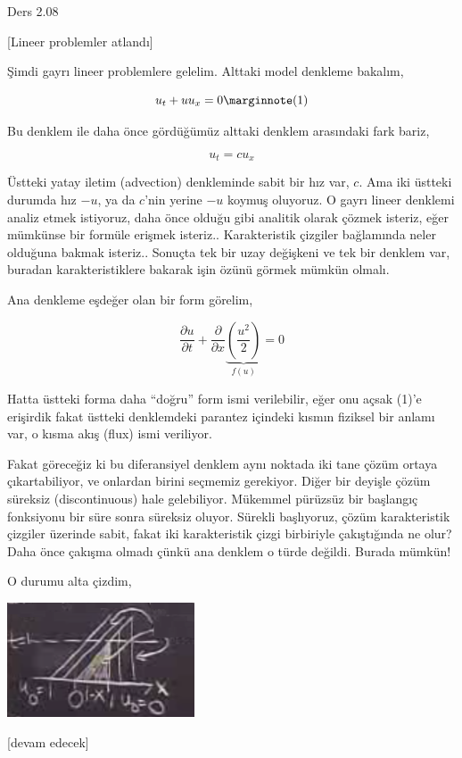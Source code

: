 \documentclass[12pt,fleqn]{article}\usepackage{../../common}
\begin{document}
Ders 2.08

[Lineer problemler atlandı]

Şimdi gayrı lineer problemlere gelelim. Alttaki model denkleme bakalım,

$$
u_t + u u_x = 0
\mlabel{1}
$$

Bu denklem ile daha önce gördüğümüz alttaki denklem arasındaki fark bariz,

$$
u_t = c u_x
$$

Üstteki yatay iletim (advection) denkleminde sabit bir hız var, $c$. Ama iki
üstteki durumda hız $-u$, ya da $c$'nin yerine $-u$ koymuş oluyoruz.  O gayrı
lineer denklemi analiz etmek istiyoruz, daha önce olduğu gibi analitik olarak
çözmek isteriz, eğer mümkünse bir formüle erişmek isteriz.. Karakteristik
çizgiler bağlamında neler olduğuna bakmak isteriz.. Sonuçta tek bir uzay
değişkeni ve tek bir denklem var, buradan karakteristiklere bakarak işin
özünü görmek mümkün olmalı.

Ana denkleme eşdeğer olan bir form görelim,

$$
\frac{\partial u}{\partial t} +
\frac{\partial }{\partial x}
\underbrace{ \left( \frac{u^2}{2} \right)}_{f(u)} = 0
$$

Hatta üstteki forma daha ``doğru'' form ismi verilebilir, eğer onu açsak (1)'e
erişirdik fakat üstteki denklemdeki parantez içindeki kısmın fiziksel bir anlamı
var, o kısma akış (flux) ismi veriliyor.

Fakat göreceğiz ki bu diferansiyel denklem aynı noktada iki tane çözüm ortaya
çıkartabiliyor, ve onlardan birini seçmemiz gerekiyor. Diğer bir deyişle çözüm
süreksiz (discontinuous) hale gelebiliyor. Mükemmel pürüzsüz bir başlangıç
fonksiyonu bir süre sonra süreksiz oluyor. Sürekli başlıyoruz, çözüm
karakteristik çizgiler üzerinde sabit, fakat iki karakteristik çizgi birbiriyle
çakıştığında ne olur? Daha önce çakışma olmadı çünkü ana denklem o türde
değildi. Burada mümkün!

O durumu alta çizdim,

\includegraphics[width=15em]{compscieng_2_08_01.png}
























[devam edecek]
  
\end{document}
